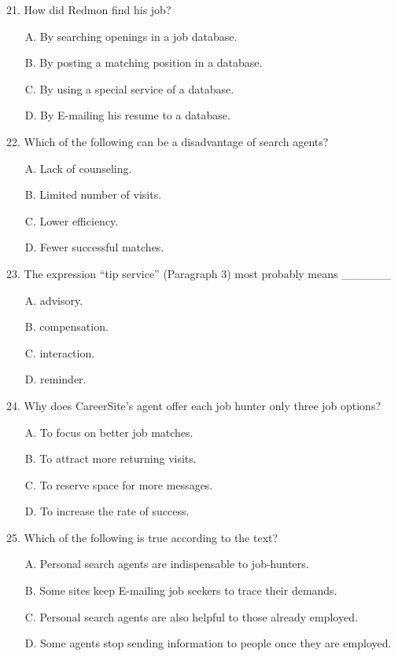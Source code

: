 \documentclass[UTF8,11pt]{ctexart}
\begin{document}
21. How did Redmon find his job?


\begin{itemize}[leftmargin=2em,itemsep=.2em,topsep=.4em]\item[A.] By searching openings in a job database.
\item[B.] By posting a matching position in a database.
\item[C.] By using a special service of a database.
\item[D.] By E-mailing his resume to a database.
\end{itemize}

22. Which of the following can be a disadvantage of search agents?


\begin{itemize}[leftmargin=2em,itemsep=.2em,topsep=.4em]\item[A.] Lack of counseling.
\item[B.] Limited number of visits.
\item[C.] Lower efficiency.
\item[D.] Fewer successful matches.
\end{itemize}

23. The expression “tip service” (Paragraph 3) most probably means \_\_\_\_\_\_


\begin{itemize}[leftmargin=2em,itemsep=.2em,topsep=.4em]\item[A.] advisory.
\item[B.] compensation.
\item[C.] interaction.
\item[D.] reminder.
\end{itemize}

24. Why does CareerSite’s agent offer each job hunter only three job options?


\begin{itemize}[leftmargin=2em,itemsep=.2em,topsep=.4em]\item[A.] To focus on better job matches.
\item[B.] To attract more returning visits.
\item[C.] To reserve space for more messages.
\item[D.] To increase the rate of success.
\end{itemize}

25. Which of the following is true according to the text?


\begin{itemize}[leftmargin=2em,itemsep=.2em,topsep=.4em]\item[A.] Personal search agents are indispensable to job-hunters.
\item[B.] Some sites keep E-mailing job seekers to trace their demands.
\item[C.] Personal search agents are also helpful to those already employed.
\item[D.] Some agents stop sending information to people once they are employed.
\end{itemize}
\end{document}
